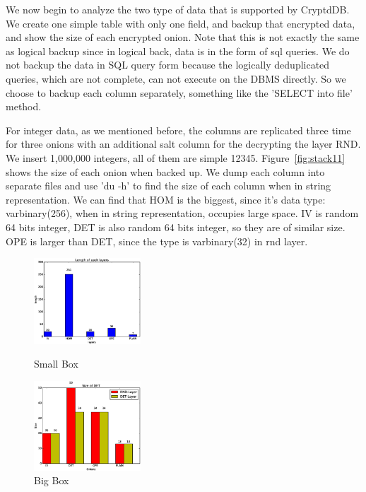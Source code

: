 We now begin to analyze the two type of data that is supported by CryptdDB. We create one simple table with only one field, and backup that encrypted data, and show the size of each encrypted onion. Note that this is not exactly the same as logical backup since in logical back, data is in the form of sql queries. We do not backup the data in SQL query form because the logically deduplicated queries, which are not complete, can not execute on the DBMS directly. So we choose to backup each column separately, something like the 'SELECT into file' method.

For integer data, as we mentioned before, the columns are replicated three time for three onions with an additional salt column for the decrypting the layer RND. We insert 1,000,000 integers, all of them are simple 12345. Figure~\ref{fig:stack11} shows the size of each onion when backed up. We dump each column into separate files and use 'du -h' to find the size of each column when in string representation. We can find that HOM is the biggest, since it's data type: varbinary(256), when in string representation, occupies large space. IV is random 64 bits integer, DET is also random 64 bits integer, so they are of similar size. OPE is larger than DET, since the type is varbinary(32) in rnd layer. 





\begin{figure}   
  \begin{minipage}[t]{0.5\linewidth}  
    \centering   
    \includegraphics[width=4.0cm]{images/size-of-each-onion.eps}   
    \caption{Small Box}   
    \label{fig:side:a}   
  \end{minipage}%
  \begin{minipage}[t]{0.5\linewidth}   
    \centering   
    \includegraphics[width=4.0cm]{images/det-rnd.eps}   
    \caption{Big Box}   
    \label{fig:side:b}   
  \end{minipage}   
\end{figure}





